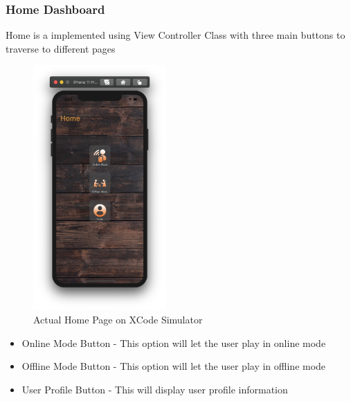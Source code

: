\documentclass{article}
\begin{document}
    \subsubsection{Home Dashboard}
        Home is a implemented using View Controller Class with three main buttons to traverse to different pages
        \begin{figure}[h]
            \centering
            \includegraphics[width=2in]{images/sim_home.png}
        \caption{Actual Home Page on XCode Simulator}
        \end{figure}
        \newline
        \begin{itemize}
            \item Online Mode Button - This option will let the user play in online mode
            \item Offline Mode Button - This option will let the user play in offline mode
            \item User Profile Button - This will display user profile information
        \end{itemize}
        \newpage
\end{document}

